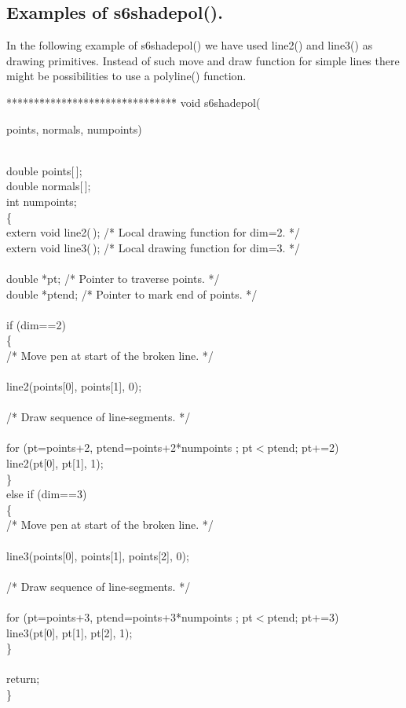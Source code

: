 \subsection{Examples of s6shadepol().}
In the following example of s6shadepol() we have used line2()
and line3() as drawing primitives. Instead of such move and draw
function for simple lines there might be possibilities to use
a polyline() function.


\begin{tabbing}
******\=*****\=*****\=*****\=*****\=*****\=    \kill
	void s6shadepol(\begin{minipg3}
		{\fov points}, {\fov normals}, {\fov numpoints})
		\end{minipg3}\\[0.3ex]
  		\>	double \>\>	{\fov points}[\,];\\
  		\>	double \>\>	{\fov normals}[\,];\\
  		\>	int    \>\>	{\fov numpoints};\\
\{ \\
\>  extern void line2(\,);\>\>\>\> /* Local drawing function for dim=2. */\\
\>  extern void line3(\,);\>\>\>\> /* Local drawing function for dim=3. */\\
  \\
\>  double *pt;\>\>\>\>  /* Pointer to traverse points. */\\
\>  double *ptend;\>\>\>\>  /* Pointer to mark end of points. */\\
  \\
\> if (dim==2)\\
\>\{ \\
\>\>  /* Move pen at start of the broken line.  */\\
 \\ 
\>\>  line2(points[0], points[1], 0);\\
  \\
\>\>  /* Draw sequence of line-segments.  */\\
  \\
\>\>  for (pt=points+2, ptend=points+2*numpoints ; pt$<$ptend; pt+=2)\\
\>\>\>    line2(pt[0], pt[1], 1);\\
\>\} \\
\>  else if (dim==3)\\
\>\{ \\

\>\>  /* Move pen at start of the broken line.  */\\
 \\ 
\>\>  line3(points[0], points[1], points[2], 0);\\
  \\
\>\>  /* Draw sequence of line-segments.  */\\
  \\
\>\>  for (pt=points+3, ptend=points+3*numpoints ; pt$<$ptend; pt+=3)\\
\>\>\>    line3(pt[0], pt[1], pt[2], 1);\\
\>\} \\
  \\
\>  return; \\
\}                                   
\end{tabbing}
